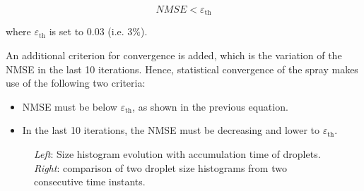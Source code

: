 \begin{equation}
NMSE < \varepsilon_\mathrm{th}
\end{equation}

where $\varepsilon_\mathrm{th}$ is set to $0.03$ (i.e. $3 \%$).

An additional criterion for convergence is added, which is the variation of the NMSE in the last 10 iterations. Hence, statistical convergence of the spray makes use of the following two criteria:

\begin{itemize}

	\item NMSE must be below $\varepsilon_\mathrm{th}$, as shown in the previous equation.
	
	\item In the last 10 iterations, the NMSE must be decreasing and lower to $\varepsilon_\mathrm{th}$.

\end{itemize}


\begin{figure}[ht]
     \centering
     \begin{subfigure}[b]{0.45\textwidth}
         \centering
     \end{subfigure}
     \begin{subfigure}[b]{0.45\textwidth}
         \centering
     \end{subfigure}
        \caption{\textsl{Left}: Size histogram evolution with accumulation time of droplets. \textsl{Right}: comparison of two droplet size histograms from two consecutive time instants.}
        \label{fig:spray_convergence_description_accumulation_and_MSE_comparison}
\end{figure}




